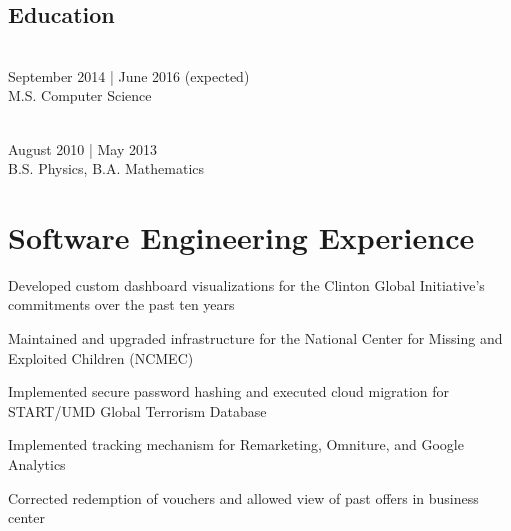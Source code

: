 \documentclass{onkursen-resume}
\begin{document}
\vspace{0.5mm}

\begin{multicols}{2}

\section*{Education}

\\
September 2014 | June 2016 (expected)\\
M.S. Computer Science\\

\vspace{6mm}

\\
August 2010 | May 2013\\
B.S. Physics, B.A. Mathematics

\end{multicols}

\vspace{-1mm}

\hr

\section*{Software Engineering Experience}

\begin{itemize*}
\item Developed custom dashboard visualizations for the Clinton Global Initiative's commitments over the past ten years
\item Maintained and upgraded infrastructure for the National Center for Missing and Exploited Children (NCMEC)
\item Implemented secure password hashing and executed cloud migration for START/UMD Global Terrorism Database
\end{itemize*}

\begin{itemize*}
\item Implemented tracking mechanism for Remarketing, Omniture, and Google Analytics
\item Corrected redemption of vouchers and allowed view of past offers in business center
\end{itemize*}
\end{document}
